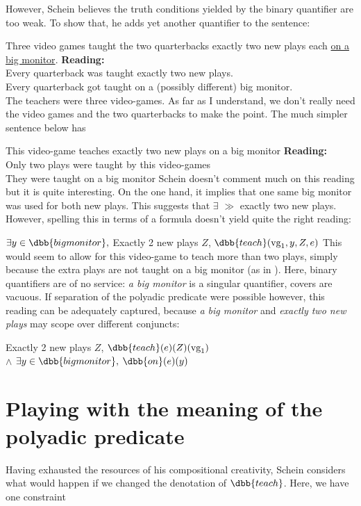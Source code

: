 \documentclass[english]{article}
\begin{document}
However, Schein believes the truth conditions yielded by the binary quantifier are too weak. To show that, he adds yet another quantifier to the sentence:

\pex
\a Three video games taught the two quarterbacks exactly two new plays each \underline{on a big monitor}. 
\a \textbf{Reading:}\\
Every quarterback was taught exactly two new plays.\\
Every quarterback got taught on a (possibly different) big monitor.\\
The teachers were three video-games.
\xe
%
 As far as I understand, we don't really need the video games and the two quarterbacks to make the point. The much simpler sentence below has

\pex
\a This video-game teaches exactly two new plays on a big monitor
\a \textbf{Reading:}\\
Only two plays were taught by this video-games\\
They were taught on a big monitor
\xe
%
Schein doesn't comment much on this reading but it is quite interesting. On the one hand, it implies that one same big monitor was used for both new plays. This suggests that \textsf{$\exists$ $\gg$ exactly two new plays}. However, spelling this in terms of a formula doesn't yield quite the right reading:

\ex
  $\exists y\in\dbb{big monitor},$ \textsf{Exactly 2 new plays} $Z$, $\dbb{teach}(\text{vg}_{1}, y, Z, e)$
 \xe
This would seem to allow for this video-game to teach more than two plays, simply because the extra plays are not taught on a big monitor (as in \cnextx). Here, binary quantifiers are of no service: \emph{a big monitor} is a singular quantifier, covers are vacuous. If separation of the polyadic predicate were possible however, this reading can be adequately captured, because \emph{a big monitor} and \emph{exactly two new plays} may scope over different conjuncts:

\ex
\textsf{Exactly 2 new plays} $Z$, $\dbb{teach}(e)(Z)(\text{vg}_{1})$\\
$\wedge$ $\exists y\in\dbb{big monitor},$ $\dbb{on}(e)(y)$
\xe
%



\section{Playing with the meaning of the polyadic predicate}
Having exhausted the resources of his compositional creativity, Schein considers what would happen if we changed the denotation of $\dbb{teach}$. Here, we have one constraint
\end{document}
